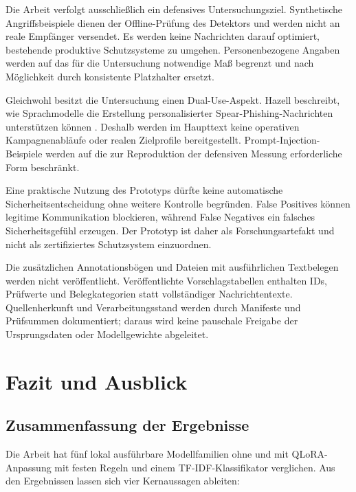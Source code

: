 \documentclass[12pt,twoside=false,a4paper,parskip]{scrbook}
\begin{document}
Die Arbeit verfolgt ausschließlich ein defensives Untersuchungsziel. Synthetische Angriffsbeispiele dienen der Offline-Prüfung des Detektors und werden nicht an reale Empfänger versendet. Es werden keine Nachrichten darauf optimiert, bestehende produktive Schutzsysteme zu umgehen. Personenbezogene Angaben werden auf das für die Untersuchung notwendige Maß begrenzt und nach Möglichkeit durch konsistente Platzhalter ersetzt.

Gleichwohl besitzt die Untersuchung einen Dual-Use-Aspekt. Hazell beschreibt, wie Sprachmodelle die Erstellung personalisierter Spear-Phishing-Nachrichten unterstützen können \cite{hazell2023spear}. Deshalb werden im Haupttext keine operativen Kampagnenabläufe oder realen Zielprofile bereitgestellt. Prompt-Injection-Beispiele werden auf die zur Reproduktion der defensiven Messung erforderliche Form beschränkt.

Eine praktische Nutzung des Prototyps dürfte keine automatische Sicherheitsentscheidung ohne weitere Kontrolle begründen. False Positives können legitime Kommunikation blockieren, während False Negatives ein falsches Sicherheitsgefühl erzeugen. Der Prototyp ist daher als Forschungsartefakt und nicht als zertifiziertes Schutzsystem einzuordnen.

Die zusätzlichen Annotationsbögen und Dateien mit ausführlichen Textbelegen werden nicht veröffentlicht. Veröffentlichte Vorschlagstabellen enthalten IDs, Prüfwerte und Belegkategorien statt vollständiger Nachrichtentexte. Quellenherkunft und Verarbeitungsstand werden durch Manifeste und Prüfsummen dokumentiert; daraus wird keine pauschale Freigabe der Ursprungsdaten oder Modellgewichte abgeleitet.

\chapter{Fazit und Ausblick}\label{ch:fazit}

\section{Zusammenfassung der Ergebnisse}\label{sec:zusammenfassung-ergebnisse}

Die Arbeit hat fünf lokal ausführbare Modellfamilien ohne und mit QLoRA-Anpassung mit festen Regeln und einem TF-IDF-Klassifikator verglichen. Aus den Ergebnissen lassen sich vier Kernaussagen ableiten:
\end{document}
